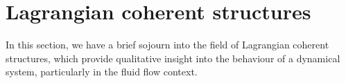 

\section{Lagrangian coherent structures}\label{sec:bkg_lcs}
In this section, we have a brief sojourn into the field of Lagrangian coherent structures, which provide qualitative insight into the behaviour of a dynamical system, particularly in the fluid flow context.

